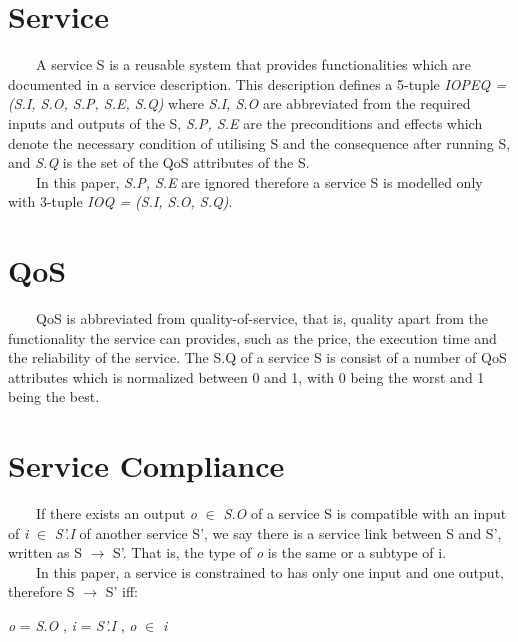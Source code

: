 \documentclass[senior,final,11pt]{iscs-thesis}
\begin{document}
\section{Service}
~~~~A service S is a reusable system that provides functionalities which are documented in a service description. This description defines a 5-tuple {\em IOPEQ = (S.I, S.O, S.P, S.E, S.Q)} where {\em S.I, S.O} are abbreviated from the required inputs and outputs of the S, {\em S.P, S.E} are the preconditions and effects which denote the necessary condition of utilising S and the consequence after running S, and {\em S.Q} is the set of the QoS attributes of the S. \\
~~~~In this paper, {\em S.P, S.E} are ignored therefore a service S is modelled only with 3-tuple {\em IOQ = (S.I, S.O, S.Q)}.
\section{QoS}
~~~~QoS is abbreviated from quality-of-service, that is, quality apart from the functionality the service can provides, such as the price, the execution time and the reliability of the service.
The S.Q of a service S is consist of a number of QoS attributes which is normalized between 0 and 1, with 0 being the worst and 1 being the best.

\section{Service Compliance}
~~~~If there exists an output {\em o} $\in$ {\em S.O} of a service S is compatible with an input of {\em i}  $\in$ {\em S'.I} of another service S', we say there is a service link between S and S', written as S $\to$ S'. That is, the type of {\em o} is the same or a subtype of i. \\
~~~~In this paper, a service is constrained to has only one input and one output, therefore S $\to$ S' iff:
\begin{center}
{\em o} = {\em S.O} ,  {\em i} = {\em S'.I} ,  {\em o} $\in$ {\em i}
\end{center}
\end{document}
